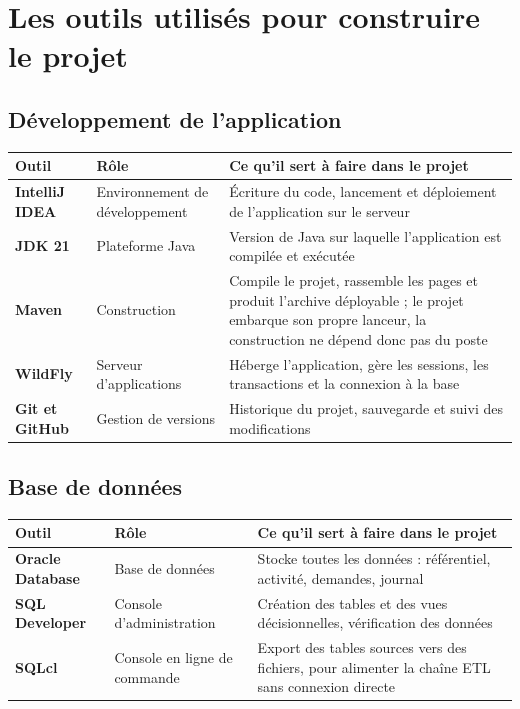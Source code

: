 \documentclass[a4paper,11pt]{article}
\begin{document}
\section{Les outils utilisés pour construire le projet}

\subsection{Développement de l'application}

\noindent\begin{tabularx}{\textwidth}{|>{\bfseries}L{3.8cm}|L{3.4cm}|X|}
\hline
\textmd{\textbf{Outil}} & \textbf{Rôle} & \textbf{Ce qu'il sert à faire dans le projet}\\
\hline
IntelliJ IDEA & Environnement de développement & Écriture du code, lancement et déploiement de l'application sur le serveur\\
\hline
JDK 21 & Plateforme Java & Version de Java sur laquelle l'application est compilée et exécutée\\
\hline
Maven & Construction & Compile le projet, rassemble les pages et produit l'archive déployable ; le projet embarque son propre lanceur, la construction ne dépend donc pas du poste\\
\hline
WildFly & Serveur d'applications & Héberge l'application, gère les sessions, les transactions et la connexion à la base\\
\hline
Git et GitHub & Gestion de versions & Historique du projet, sauvegarde et suivi des modifications\\
\hline
\end{tabularx}

\subsection{Base de données}

\noindent\begin{tabularx}{\textwidth}{|>{\bfseries}L{3.8cm}|L{3.4cm}|X|}
\hline
\textmd{\textbf{Outil}} & \textbf{Rôle} & \textbf{Ce qu'il sert à faire dans le projet}\\
\hline
Oracle Database & Base de données & Stocke toutes les données : référentiel, activité, demandes, journal\\
\hline
SQL Developer & Console d'administration & Création des tables et des vues décisionnelles, vérification des données\\
\hline
SQLcl & Console en ligne de commande & Export des tables sources vers des fichiers, pour alimenter la chaîne ETL sans connexion directe\\
\hline
\end{tabularx}
\end{document}
